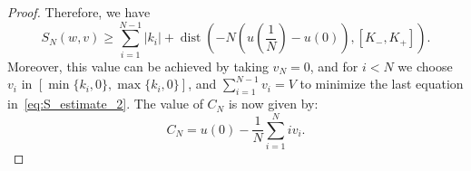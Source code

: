 \documentclass[12pt]{amsart}
\numberwithin{equation}{section}
\theoremstyle{remark}
\begin{document}
\begin{proof}
Therefore, we have
\begin{equation}
    S_N(w,v)\ge \sum_{i=1}^{N-1} |k_i| + \operatorname{dist}(-N(u(\frac 1 N)-u(0)), [K_-, K_+]).
\end{equation}
Moreover, this value can be achieved by taking
$v_N = 0$, and for $i < N$ we choose $v_i$ in $[\min\{k_i, 0\}, \max\{k_i, 0\}]$, and $\sum_{i=1}^{N-1} v_i = V$ to minimize the last equation in~\eqref{eq:S_estimate_2}. The value of $C_N$ is now given by:
\begin{equation}
    C_N= u(0)-\frac{1}{N} \sum_{i=1}^N iv_i.
\end{equation}
\end{proof}
\end{document}
